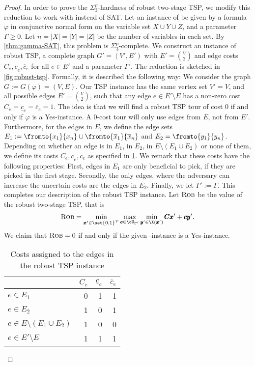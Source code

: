 \documentclass[a4paper,abstracton]{scrartcl}
\begin{document}
\begin{proof}
In order to prove the $\Sigma_3^p$-hardness of robust two-stage TSP, we modify this reduction to work with {\radj} instead of SAT. 
Let an instance of {\radj} be given by a formula $\varphi$ in conjunctive normal form on the variable set $X \cup Y \cup Z$, and a parameter $\Gamma \geq 0$. 
Let $n = |X| = |Y| = |Z|$ be the number of variables in each set. 
By \cref{thm:gamma-SAT}, this problem is $\Sigma_3^p$-complete. 
We construct an instance of robust TSP,  a complete graph $G' = (V',E')$ with $E' = {V \choose 2}$ and edge costs $C_e, \underline{c}_e, \overline{c}_e$ for all $e \in E'$ and a parameter $\Gamma'$.
The reduction is sketched in \cref{fig:robust-tsp}. Formally, it is described the following way:
We consider the graph $G := G(\varphi) = (V,E)$. Our TSP instance has the same vertex set $V' = V$, and all possible edges $E' = {V \choose 2}$, such that any edge $e \in E' \setminus E$ has a non-zero cost $C_e = \underline{c}_e = \overline{c}_e = 1$. 
The idea is that we will find a robust TSP tour of cost 0 if and only if $\varphi$ is a Yes-instance. A 0-cost tour will only use edges from $E$, not from $E'$.
 Furthermore, for the edges in $E$, we define the edge sets $E_1 := \fromto{x_1}{x_n} \cup \fromto{\overline{x}_1}{\overline{x}_n}$ and $E_2 = \fromto{y_1}{y_n}$.
Depending on whether an edge is in $E_1$, in $E_2$, in $E \setminus (E_1 \cup E_2)$ or none of them, we define its costs $C_e, \underline{c}_e, \overline{c}_e$ as specified in \cref{table:tsp}. 
We remark that these costs have the following properties: First, edges in $E_1$ are only beneficial to pick, if they are picked in the first stage. 
Secondly, the only edges, where the adversary can increase the uncertain costs are the edges in $E_2$.
Finally, we let $\Gamma' := \Gamma$. This completes our description of the robust TSP instance.
Let $\textsc{Rob}$ be the value of the robust two-stage TSP, that is
\begin{equation}
\textsc{Rob} = \min_{\pmb x' \in \set{0,1}^V} \max_{\pmb c \in \cU_{\Gamma'} } \min_{\pmb y' \in \X(\pmb x')} \pmb C \pmb x' + \pmb c \pmb y'. \label{eq:two-stage-tsp}
\end{equation} 
We claim that $\textsc{Rob} = 0$ if and only if the given {\radj}-instance is a Yes-instance.
\begin{table}
\centering
\begin{tabular}{l|rrr}
& $C_e$ & $\underline{c}_e$ & $\overline{c}_e$ \\
\hline
$e \in E_1$ & 0 & 1 & 1 \\
$e \in E_2$ & 1 & 0 & 1 \\
$e \in E \setminus (E_1 \cup E_2)$ & 1 & 0 & 0 \\
$e \in E' \setminus E$ & 1 & 1 & 1
\end{tabular}
\caption{Costs assigned to the edges in the robust TSP instance}
\label{table:tsp}
\end{table}


\end{proof}
\end{document}
